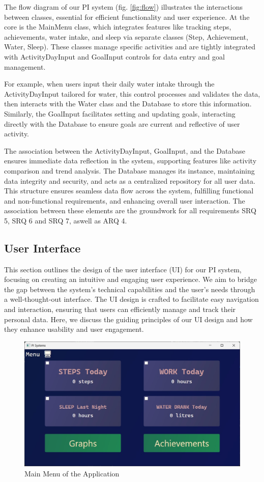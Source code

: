 \documentclass[12pt]{article}
\begin{document}
The flow diagram of our PI system (fig. \ref{fig:flow}) illustrates the
interactions between classes, essential for efficient functionality and user
experience. At the core is the MainMenu class, which integrates features like
tracking steps, achievements, water intake, and sleep via separate classes
(Step, Achievement, Water, Sleep). These classes manage specific activities and
are tightly integrated with ActivityDayInput and GoalInput controls for data
entry and goal management.\par

For example, when users input their daily water intake through the
ActivityDayInput tailored for water, this control processes and validates the
data, then interacts with the Water class and the Database to store this
information. Similarly, the GoalInput facilitates setting and updating goals,
interacting directly with the Database to ensure goals are current and
reflective of user activity.\par

The association between the ActivityDayInput, GoalInput, and the Database
ensures immediate data reflection in the system, supporting features like
activity comparison and trend analysis. The Database manages its instance,
maintaining data integrity and security, and acts as a centralized repository
for all user data. This structure ensures seamless data flow across the system,
fulfilling functional and non-functional requirements, and enhancing overall
user interaction. The association between these elements are the groundwork for all requirements SRQ 5, SRQ 6 and SRQ 7, aswell as ARQ 4.\par

\subsection{User Interface}

This section outlines the design of the user interface (UI) for our PI system,
focusing on creating an intuitive and engaging user experience. We aim to bridge
the gap between the system's technical capabilities and the user's needs through
a well-thought-out interface. The UI design is crafted to facilitate easy
navigation and interaction, ensuring that users can efficiently manage and track
their personal data. Here, we discuss the guiding principles of our UI design and
how they enhance usability and user engagement.\par

\begin{figure}[!ht]
  \centering
  \includegraphics[width = 0.5\linewidth]{Main Menu}
  \caption{Main Menu of the Application}
  \label{fig:Menu}
\end{figure}
\end{document}
